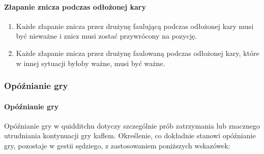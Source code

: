 \documentclass[12pt]{article}
\begin{document}
\paragraph{Złapanie znicza podczas odłożonej kary}

\begin{enumerate}
	\item
	      Każde złapanie znicza przez drużynę faulującą podczas odłożonej kary
	      musi być nieważne i znicz musi zostać przywrócony na pozycję.
	\item
	      Każde złapanie znicza przez drużynę faulowaną podczas odłożonej kary,
	      które w innej sytuacji byłoby ważne, musi być ważne.
\end{enumerate}

\subsubsection{Opóźnianie gry}

\paragraph{Opóźnianie gry}
Opóźnianie gry w quidditchu dotyczy
szczególnie prób zatrzymania lub znacznego utrudniania kontynuacji gry
kaflem. Określenie, co dokładnie stanowi opóźnianie gry, pozostaje w
gestii sędziego, z zastosowaniem poniższych wskazówek:
\end{document}
